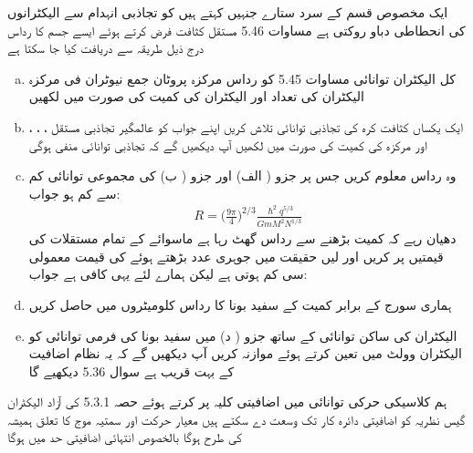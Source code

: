 ایک مخصوص قسم کے سرد ستارے جنہیں   کہتے ہیں کو تجاذبی انہدام سے الیکٹرانوں کی انحطاطی دباو روکتی ہے مساوات 5.46 مستقل کثافت فرض کرتے ہوئے ایسے جسم کا رداس  درج ذیل طریقہ سے دریافت کیا جا سکتا ہے 
\begin{enumerate}[a.]
\item
کل الیکٹران توانائی مساوات 5.45 کو رداس مرکزہ پروٹان جمع نیوٹران  فی مرکزہ الیکٹران کی تعداد  اور الیکٹران کی کمیت  کی صورت میں لکھیں 
\item
ایک یکساں  کثافت کرہ   کی تجاذبی توانائی تلاش کریں اپنے جواب کو عالمگیر تجاذبی مستقل ، ، ، اور مرکزہ کی کمیت  کی صورت میں لکھیں آپ دیکھیں گے کہ تجاذبی توانائی منفی ہوگی 
\item
وہ رداس معلوم کریں جس پر جزو ( الف) اور جزو ( ب) کی مجموعی توانائی کم سے کم ہو جواب:
\begin{align*}
R = \big ( \frac{9 \pi}{4} \big )^{2/3} \frac{\hslash^2 q^{5/3}}{GmM^2 N^{1/3}}
\end{align*}
دھیان رہے کہ کمیت بڑھنے سے رداس گھٹ رہا ہے ماسوائے  کے تمام مستقلات کی قیمتیں پر کریں اور  لیں حقیقت میں جوہری عدد بڑھتے ہوئے  کی قیمت معمولی سی کم ہوتی ہے لیکن ہمارے لئے یہی کافی ہے جواب:   \item ہماری سورج کے برابر کمیت کے سفید بونا کا رداس کلومیٹروں میں حاصل کریں 
\item
الیکٹران کی ساکن توانائی کے ساتھ جزو ( د) میں سفید بونا کی فرمی توانائی کو الیکٹران وولٹ میں تعین کرتے ہوئے موازنہ کریں آپ دیکھیں گے کہ یہ نظام اضافیت کے بہت قریب ہے سوال 5.36 دیکھیے گا
\end{enumerate}
ہم کلاسیکی حرکی توانائی  میں اضافیتی کلیہ  پر کرتے ہوئے حصہ 5.3.1 کی آزاد الیکٹران گیس نظریہ کو اضافیتی دائرہ کار تک وسعت دے سکتے ہیں معیار حرکت اور سمتیہ موج کا تعلق ہمیشہ کی طرح  ہوگا بالخصوص انتہائی اضافیتی حد میں  ہوگا 
